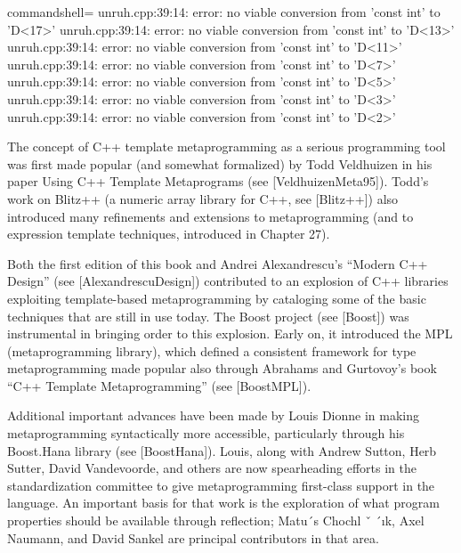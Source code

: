 \begin{tcblisting}{commandshell={}}
unruh.cpp:39:14: error: no viable conversion from ’const int’ to ’D<17>’
unruh.cpp:39:14: error: no viable conversion from ’const int’ to ’D<13>’
unruh.cpp:39:14: error: no viable conversion from ’const int’ to ’D<11>’
unruh.cpp:39:14: error: no viable conversion from ’const int’ to ’D<7>’
unruh.cpp:39:14: error: no viable conversion from ’const int’ to ’D<5>’
unruh.cpp:39:14: error: no viable conversion from ’const int’ to ’D<3>’
unruh.cpp:39:14: error: no viable conversion from ’const int’ to ’D<2>’
\end{tcblisting}

The concept of C++ template metaprogramming as a serious programming tool was first made popular (and somewhat formalized) by Todd Veldhuizen in his paper Using C++ Template Metaprograms (see [VeldhuizenMeta95]). Todd’s work on Blitz++ (a numeric array library for C++, see [Blitz++]) also introduced many refinements and extensions to metaprogramming (and to expression template techniques, introduced in Chapter 27).

Both the first edition of this book and Andrei Alexandrescu’s “Modern C++ Design” (see [AlexandrescuDesign]) contributed to an explosion of C++ libraries exploiting template-based metaprogramming by cataloging some of the basic techniques that are still in use today. The Boost project (see [Boost]) was instrumental in bringing order to this explosion. Early on, it introduced the MPL (metaprogramming library), which defined a consistent framework for type metaprogramming made popular also through Abrahams and Gurtovoy’s book “C++ Template Metaprogramming” (see [BoostMPL]).

Additional important advances have been made by Louis Dionne in making metaprogramming syntactically more accessible, particularly through his Boost.Hana library (see [BoostHana]). Louis, along with Andrew Sutton, Herb Sutter, David Vandevoorde, and others are now spearheading efforts in the standardization committee to give metaprogramming first-class support in the language. An important basis for that work is the exploration of what program properties should be available through reflection; Matu´s Chochl ˇ ´ık, Axel Naumann, and David Sankel are principal contributors in that area.

